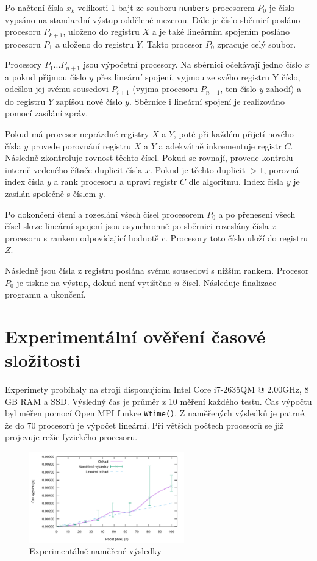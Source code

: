 \documentclass[11pt,a4paper]{article}
\begin{document}
Po načtení čísla $x_k$ velikosti 1 bajt ze souboru \texttt{numbers} procesorem $P_0$ je číslo vypsáno na standardní výstup oddělené mezerou. Dále je číslo sběrnicí posláno procesoru $P_{k+1}$, uloženo do registru $X$ a je také lineárním spojením posláno procesoru $P_1$ a uloženo do registru $Y$. Takto procesor $P_0$ zpracuje celý soubor.

Procesory $P_1 ... P_{n+1}$ jsou výpočetní procesory. Na sběrnici očekávají jedno číslo $x$ a pokud přijmou číslo $y$ přes lineární spojení, vyjmou ze svého registru Y číslo, odešlou jej svému sousedovi $P_{i+1}$ (vyjma procesoru $P_{n+1}$, ten číslo $y$ zahodí) a do registru $Y$ zapíšou nové číslo $y$. Sběrnice i lineární spojení je realizováno pomocí zasílání zpráv.

Pokud má procesor neprázdné registry $X$ a $Y$, poté při každém přijetí nového čísla $y$ provede porovnání registru $X$ a $Y$ a adekvátně inkrementuje registr $C$. Následně zkontroluje rovnost těchto čísel. Pokud se rovnají, provede kontrolu interně vedeného čítače duplicit čísla $x$. Pokud je těchto duplicit $>1$, porovná index čísla $y$ a rank procesoru a upraví registr $C$ dle algoritmu. Index čísla $y$ je zasílán společně s číslem $y$.

Po dokončení čtení a rozeslání všech čísel procesorem $P_0$ a po přenesení všech čísel skrze lineární spojení jsou asynchronně po sběrnici rozeslány čísla $x$ procesoru s rankem odpovídající hodnotě $c$. Procesory toto číslo uloží do registru $Z$.

Následně jsou čísla z registru poslána svému sousedovi s nižším rankem. Procesor $P_0$ je tiskne na výstup, dokud není vytištěno $n$ čísel. Následuje finalizace programu a ukončení.

\section{Experimentální ověření časové složitosti}

Experimety probíhaly na stroji disponujícím Intel Core i7-2635QM @ 2.00GHz, 8 GB RAM a SSD. Výsledný čas je průměr z 10 měření každého testu. Čas výpočtu byl měřen pomocí Open MPI funkce \texttt{Wtime()}. Z naměřených výsledků je patrné, že do 70 procesorů je výpočet lineární. Při větších počtech procesorů se již projevuje režie fyzického procesoru.

\begin{figure}[!ht]
    \centering
		\includegraphics[width=0.6\textwidth]{results}
    \caption{Experimentálně naměřené výsledky}
\end{figure}
\end{document}
